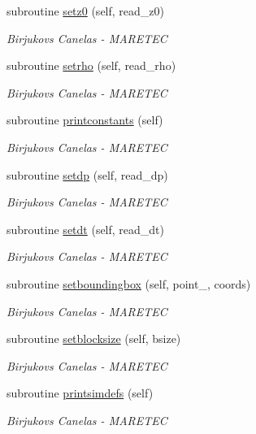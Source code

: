 \begin{DoxyCompactItemize}
subroutine \hyperlink{namespacesimulation__globals__mod_a64b1d91147c1cd5898fec8f23d56a65d}{setz0} (self, read\+\_\+z0)
\begin{DoxyCompactList}\small\item\em Birjukovs Canelas -\/ M\+A\+R\+E\+T\+EC \end{DoxyCompactList}\item 
subroutine \hyperlink{namespacesimulation__globals__mod_a68a87c39cf88bad353e28e367a721ed4}{setrho} (self, read\+\_\+rho)
\begin{DoxyCompactList}\small\item\em Birjukovs Canelas -\/ M\+A\+R\+E\+T\+EC \end{DoxyCompactList}\item 
subroutine \hyperlink{namespacesimulation__globals__mod_a20ba28d72a9bea823d9373a94f97026e}{printconstants} (self)
\begin{DoxyCompactList}\small\item\em Birjukovs Canelas -\/ M\+A\+R\+E\+T\+EC \end{DoxyCompactList}\item 
subroutine \hyperlink{namespacesimulation__globals__mod_acb8e3762572266b40a0deb166dded33a}{setdp} (self, read\+\_\+dp)
\begin{DoxyCompactList}\small\item\em Birjukovs Canelas -\/ M\+A\+R\+E\+T\+EC \end{DoxyCompactList}\item 
subroutine \hyperlink{namespacesimulation__globals__mod_aecf75eeccef4eeae6d10ab26cf2dcfcf}{setdt} (self, read\+\_\+dt)
\begin{DoxyCompactList}\small\item\em Birjukovs Canelas -\/ M\+A\+R\+E\+T\+EC \end{DoxyCompactList}\item 
subroutine \hyperlink{namespacesimulation__globals__mod_a412b0779703630189e2ea14e4b390864}{setboundingbox} (self, point\+\_\+, coords)
\begin{DoxyCompactList}\small\item\em Birjukovs Canelas -\/ M\+A\+R\+E\+T\+EC \end{DoxyCompactList}\item 
subroutine \hyperlink{namespacesimulation__globals__mod_aa65b43534d2d2b6366a4ebc791194805}{setblocksize} (self, bsize)
\begin{DoxyCompactList}\small\item\em Birjukovs Canelas -\/ M\+A\+R\+E\+T\+EC \end{DoxyCompactList}\item 
subroutine \hyperlink{namespacesimulation__globals__mod_ad331ccf019de7ed531e37c655600f90f}{printsimdefs} (self)
\begin{DoxyCompactList}\small\item\em Birjukovs Canelas -\/ M\+A\+R\+E\+T\+EC \end{DoxyCompactList}\end{DoxyCompactItemize}
